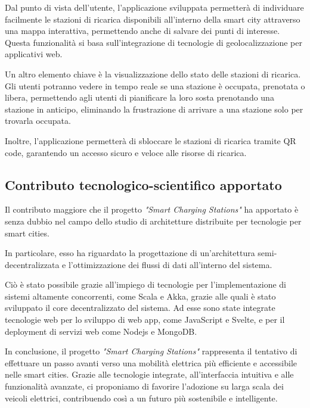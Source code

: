 Dal punto di vista dell'utente, l'applicazione sviluppata permetterà di individuare facilmente le
stazioni di ricarica disponibili all'interno della smart city attraverso una mappa interattiva, permettendo anche di
salvare dei punti di interesse.
Questa funzionalità si basa sull'integrazione di tecnologie di geolocalizzazione per applicativi web.

Un altro elemento chiave è la visualizzazione dello stato delle stazioni di ricarica.
Gli utenti potranno vedere in tempo reale se una stazione è occupata, prenotata o libera, permettendo
agli utenti di pianificare la loro sosta prenotando una stazione in anticipo, eliminando la frustrazione di arrivare a una stazione
solo per trovarla occupata.

Inoltre, l'applicazione permetterà di sbloccare le stazioni di ricarica tramite QR code, garantendo un accesso sicuro e veloce alle risorse di ricarica.

\subsection{Contributo tecnologico-scientifico apportato}
Il contributo maggiore che il progetto \textit{"Smart Charging Stations"} ha apportato è senza dubbio nel campo dello studio di architetture distribuite per tecnologie per smart cities.

In particolare, esso ha riguardato la progettazione di un'architettura semi-decentralizzata e l'ottimizzazione dei flussi di dati all'interno
del sistema.

Ciò è stato possibile grazie all'impiego di tecnologie per l'implementazione di sistemi altamente concorrenti, come Scala e Akka, grazie alle quali è stato sviluppato il core decentralizzato del sistema.
Ad esse sono state integrate tecnologie web per lo sviluppo di web app, come JavaScript e Svelte, e per il deployment di servizi web come Nodejs e MongoDB.

In conclusione, il progetto \textit{"Smart Charging Stations"} rappresenta il tentativo di effettuare un passo avanti verso una mobilità elettrica più efficiente e accessibile nelle smart cities.
Grazie alle tecnologie integrate, all'interfaccia intuitiva e alle funzionalità avanzate, ci proponiamo di favorire l'adozione su larga scala dei veicoli elettrici, contribuendo
così a un futuro più sostenibile e intelligente.



